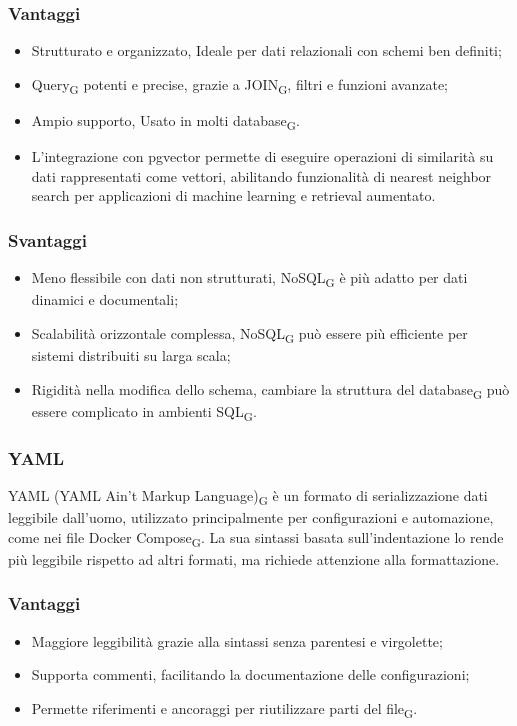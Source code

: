 \subsubsection{Vantaggi}
\begin{itemize}
    \item Strutturato e organizzato, Ideale per dati relazionali con schemi ben definiti;
    \item Query\textsubscript{G} potenti e precise, grazie a JOIN\textsubscript{G}, filtri e funzioni avanzate;
    \item Ampio supporto, Usato in molti database\textsubscript{G}.
    \item L’integrazione con pgvector permette di eseguire operazioni di similarità su dati rappresentati come vettori, abilitando funzionalità di nearest neighbor search per applicazioni di machine learning e retrieval aumentato.
\end{itemize}
\subsubsection{Svantaggi}
\begin{itemize}
    \item Meno flessibile con dati non strutturati, NoSQL\textsubscript{G} è più adatto per dati dinamici e documentali;
    \item Scalabilità orizzontale complessa, NoSQL\textsubscript{G} può essere più efficiente per sistemi distribuiti su larga scala;
    \item Rigidità nella modifica dello schema, cambiare la struttura del database\textsubscript{G} può essere complicato in ambienti SQL\textsubscript{G}.
\end{itemize}

\subsubsection{YAML}
YAML (YAML Ain’t Markup Language)\textsubscript{G} è un formato di serializzazione dati leggibile dall’uomo, utilizzato principalmente per configurazioni e automazione, come nei file Docker Compose\textsubscript{G}. La sua sintassi basata sull’indentazione lo rende più leggibile rispetto ad altri formati, ma richiede attenzione alla formattazione.
\subsubsection{Vantaggi}
\begin{itemize}
    \item Maggiore leggibilità grazie alla sintassi senza parentesi e virgolette;
    \item Supporta commenti, facilitando la documentazione delle configurazioni;
    \item Permette riferimenti e ancoraggi per riutilizzare parti del file\textsubscript{G}.
\end{itemize}
